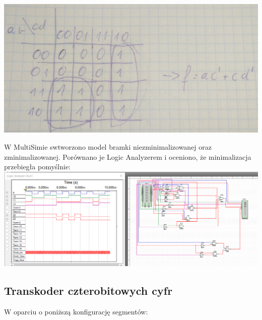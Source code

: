 \documentclass[12pt,a4paper]{article}
\begin{document}
\centering
\includegraphics[scale=0.15]{2bTable}
\raggedright
W MultiSimie swtworzono model bramki niezminimalizowanej oraz zminimalizowanej. Porównano je Logic Analyzerem i oceniono, że minimalizacja przebiegła pomyślnie:
\includegraphics[width=\textwidth]{2b}
\newpage

\subsection{Transkoder czterobitowych cyfr}
\centering
W oparciu o poniższą konfigurację segmentów:
\end{document}
